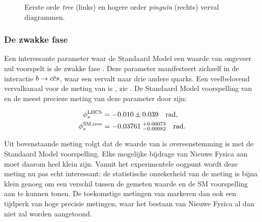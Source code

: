 \begin{figure}[t]
  \begin{subfigure}{0.5\textwidth}
    \raggedright
    {\scalebox{1}{\sffamily }}
    \caption{}
    \label{app_nl_jpsiphi_tree}
  \end{subfigure}%
  \hfill
  \begin{subfigure}{0.5\textwidth}
    \raggedleft
    {\scalebox{1}{\sffamily }}
    \caption{}
    \label{app_nl_jpsiphi_peng}
  \end{subfigure}
     \caption{Eerste orde {\it tree} (links) en hogere order {\it pingu\"in} (rechts) \BsJpsiPhi verval diagrammen.}
  \label{app_nl_jpsiphi_tree_peng}
\end{figure}



\subsubsection{De zwakke fase \phis}
Een interessante parameter waar de Standaard Model een waarde van ongeveer nul voorspelt is de zwakke fase \phis. Deze parameter manifesteert zichzelf in de interactie $b\rightarrow c\overline {c}s$, waar een \bquark vervalt naar drie andere quarks. Een veelbelovend vervalkanaal voor de meting van \phis is \BsJpsiPhi, zie . De Standaard Model voorspelling van \phis en de meest precieze meting van deze parameter door \lhcb zijn:

\begin{subequations}
  \label{app_nl_phis_lhcb_theo}
  \begin{align}
  \centering
  \phiS{\lhcb}           &=  -0.010 \pm 0.039  \quad {\rm rad},
  \label{app_nl_phis_lhcb}\\
  \phiS{SM,tree}  &= -0.03761 \; ^{+0.00073}_{-0.00082}  \quad {\rm rad}.
  \label{app_nl_phis_theo}
\end{align}
\end{subequations}


\noindent Uit bovenstaande meting volgt dat de waarde van \phis is overeenstemming is met de Standaard Model voorspelling. Elke mogelijke bijdrage van Nieuwe Fysica aan \phis moet daarom heel klein zijn. Vanuit het experimentele oogpunt wordt deze meting nu pas echt interessant: de statistische onzekerheid van de meting is bijna klein genoeg om een verschil tussen de gemeten waarde en de SM voorspelling aan te kunnen tonen. De toekomstige metingen van \phis markeren dan ook een tijdperk van hoge precisie metingen, waar het bestaan van Nieuwe Fysica al dan niet zal worden aangetoond.

